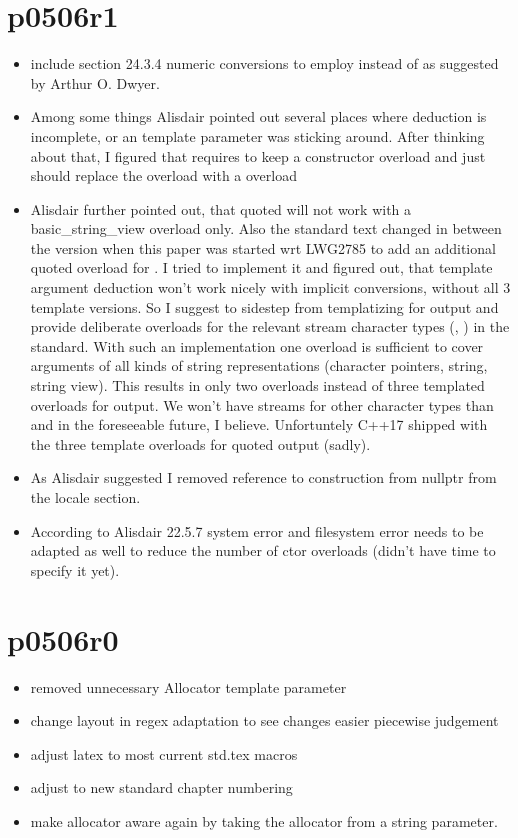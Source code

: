 \documentclass[ebook,11pt,article]{memoir}
\begin{document}
\section{p0506r1} 
\begin{itemize}
\item include section 24.3.4 numeric conversions to employ  instead of  as suggested by Arthur O. Dwyer.
\item Among some things Alisdair pointed out several places where deduction is incomplete, or an  template parameter was sticking around. After thinking about that, I figured that  requires to keep a  constructor overload and just should replace the  overload with a  overload
\item Alisdair further pointed out, that quoted will not work with a basic_string_view overload only. Also the standard text changed in between the version when this paper was started wrt LWG2785 to add an additional quoted overload for . I tried to implement it and figured out, that template argument deduction won't work nicely with implicit conversions, without all 3 template versions. So I suggest to sidestep from templatizing  for output and provide deliberate overloads for the relevant stream character types (, ) in the standard. With such an implementation one  overload is sufficient to cover arguments of all kinds of string representations (character pointers, string, string view). This results in only two overloads instead of three templated overloads for output. We won't have streams for other character types than  and  in the foreseeable future, I believe. Unfortuntely C++17 shipped with the three template overloads for quoted output (sadly).

\item As Alisdair suggested I removed reference to construction from nullptr from the locale section.

\item According to Alisdair 22.5.7 system error and filesystem error needs to be adapted as well to reduce the number of ctor overloads (didn't have time to specify it yet).

\end{itemize}

\section{p0506r0} 
\begin{itemize}
\item removed unnecessary Allocator template parameter
\item change layout in regex adaptation to see changes easier piecewise judgement
\item adjust latex to most current std.tex macros
\item adjust to new standard chapter numbering
\item make  allocator aware again by taking the allocator from a string parameter.
\end{itemize}
\end{document}
